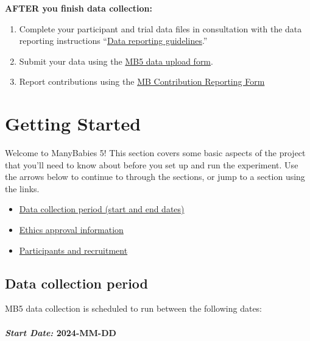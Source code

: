 \documentclass[
]{book}
\providecommand{\tightlist}{%
  \setlength{\itemsep}{0pt}\setlength{\parskip}{0pt}}
\begin{document}
\textbf{AFTER you finish data collection:}

\begin{enumerate}
\def\labelenumi{\arabic{enumi}.}
\setcounter{enumi}{11}
\tightlist
\item
  Complete your participant and trial data files in consultation with the data reporting instructions ``\hyperref[data-reporting-guidelines]{Data reporting guidelines}.''
\item
  Submit your data using the \href{https://docs.google.com/forms/d/e/1FAIpQLSdFYk-gb4yjRYLjSTP1_BVaW-3vLkpJClLoY2BOGDGfIVE5ww/viewform?usp=sf_link}{MB5 data upload form}.
\item
  Report contributions using the \href{https://manybabies.org/credit/}{MB Contribution Reporting Form}
\end{enumerate}

\chapter{Getting Started}\label{getting-started}

Welcome to ManyBabies 5! This section covers some basic aspects of the project that you'll need to know about before you set up and run the experiment. Use the arrows below to continue to through the sections, or jump to a section using the links.

\begin{itemize}
\tightlist
\item
  \hyperref[data-collection-period]{Data collection period (start and end dates)}
\item
  \hyperref[ethics-approval]{Ethics approval information}
\item
  \hyperref[participants-and-recruitment]{Participants and recruitment}
\end{itemize}

\section{Data collection period}\label{data-collection-period}

MB5 data collection is scheduled to run between the following dates:

\subsubsection*{\texorpdfstring{\emph{Start Date:} \textbf{2024-MM-DD}}{Start Date: 2024-MM-DD}}\label{start-date-2024-mm-dd}
\end{document}
